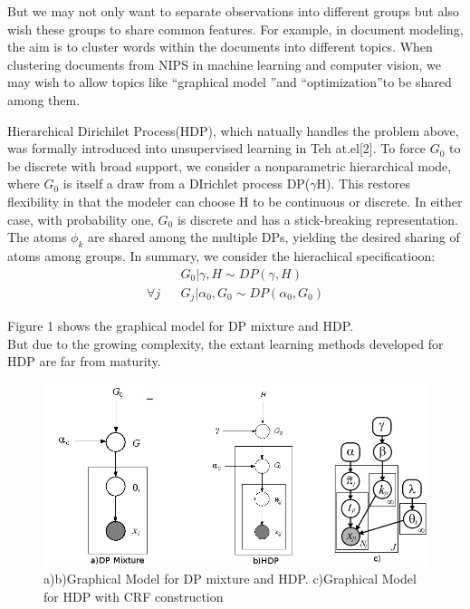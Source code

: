 \documentclass{article}
\begin{document}
But we may not only want to separate observations into different groups but also wish these groups to share common features. 
For example, in document modeling, the aim is to cluster words within the documents into different topics. 
When clustering documents from NIPS in machine learning and  computer vision, 
we may wish to allow topics like \textquotedblleft graphical model \textquotedblright and \textquotedblleft optimization\textquotedblright to be shared among them. 


Hierarchical Dirichilet Process(HDP), which natually handles the problem above, was formally introduced into unsupervised learning in Teh at.el[2].
To force $G_{0}$ to be discrete with broad support, we consider a nonparametric hierarchical mode, where $G_{0}$ is itself a draw from a
DIrichlet process DP($\gamma$H). This restores flexibility in that the modeler can choose H to be continuous or discrete. 
In either case, with probability one, $G_{0}$ is discrete and has a stick-breaking representation. The atoms $\phi_{k}$ are shared among the multiple
DPs, yielding the desired sharing of atoms among groups. In summary, we consider the hierachical specificatioon:
\begin{eqnarray*}
 & &G_{0}|\gamma,H \sim DP(\gamma,H)\\
\forall j & &G_{j}|\alpha_{0},G_{0} \sim DP(\alpha_{0},G_{0}) 
\end{eqnarray*}



Figure 1 shows the graphical model for DP mixture and HDP. \\
But due to the growing complexity, the extant learning methods developed for HDP are far from maturity.
\begin{figure}[h] 
    \centering 
    \includegraphics[width=1.0\textwidth]{gm.jpg} 
    \caption{a)b)Graphical Model for DP mixture and HDP.  c)Graphical Model for HDP with CRF construction} 
    \label{fig:by:table} 
\end{figure}
\end{document}
